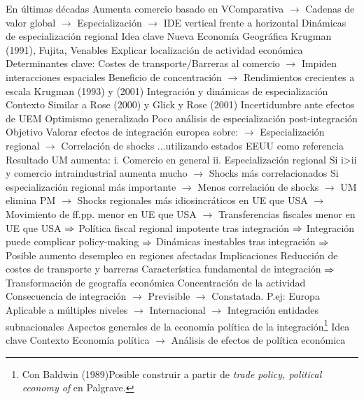 \documentclass{nuevotema}
\begin{document}
\begin{esquemal}
				\4[] En últimas décadas
				\4[] Aumenta comercio basado en VComparativa
				\4[] $\to$ Cadenas de valor global
				\4[] $\to$ Especialización
				\4[] $\to$ IDE vertical frente a horizontal
		\2 Dinámicas de especialización regional
			\3 Idea clave
				\4 Nueva Economía Geográfica
				\4[] Krugman (1991), Fujita, Venables
				\4[] Explicar localización de actividad económica
				\4 Determinantes clave:
				\4[] Costes de transporte/Barreras al comercio
				\4[] $\to$ Impiden interacciones espaciales
				\4[] Beneficio de concentración
				\4[] $\to$ Rendimientos crecientes a escala
			\3 Krugman (1993) y (2001)
				\4 Integración y dinámicas de especialización
				\4 Contexto
				\4[] Similar a Rose (2000) y Glick y Rose (2001)
				\4[] Incertidumbre ante efectos de UEM
				\4[] Optimismo generalizado
				\4[] Poco análisis de especialización post-integración
				\4 Objetivo
				\4[] Valorar efectos de integración europea sobre:
				\4[] $\to$ Especialización regional
				\4[] $\to$ Correlación de shocks
				\4[] ...utilizando estados EEUU como referencia
				\4 Resultado
				\4[] UM aumenta:
				\4[] i. Comercio en general
				\4[] ii. Especialización regional
				\4[] Si i>ii y comercio intraindustrial aumenta mucho
				\4[] $\to$ Shocks más correlacionados
				\4[] Si especialización regional más importante
				\4[] $\to$ Menos correlación de shocks
				\4[] $\to$ UM elimina PM
				\4[] $\to$ Shocks regionales más idiosincráticos en UE que USA
				\4[] $\to$ Movimiento de ff.pp. menor en UE que USA
				\4[] $\to$ Transferencias fiscales menor en UE que USA
				\4[] $\Rightarrow$ Política fiscal regional impotente tras integración
				\4[] $\Rightarrow$ Integración puede complicar policy-making
				\4[] $\Rightarrow$ Dinámicas inestables tras integración
				\4[] $\Rightarrow$ Posible aumento desempleo en regiones afectadas
			\3 Implicaciones
				\4 Reducción de costes de transporte y barreras
				\4[] Característica fundamental de integración
				\4[] $\Rightarrow$ Transformación de geografía económica
				\4 Concentración de la actividad
				\4[] Consecuencia de integración
				\4[] $\to$ Previsible
				\4[] $\to$ Constatada. P.ej: Europa
				\4[] Aplicable a múltiples niveles
				\4[] $\to$ Internacional
				\4[] $\to$ Integración entidades subnacionales
	\1 
		\2 Aspectos generales de la economía política de la integración\footnote{Con Baldwin (1989)Posible construir a partir de \textit{trade policy, political economy of} en Palgrave.}
			\3 Idea clave
				\4 Contexto
				\4[] Economía política
				\4[] $\to$ Análisis de efectos de política económica

\end{esquemal}
\end{document}
